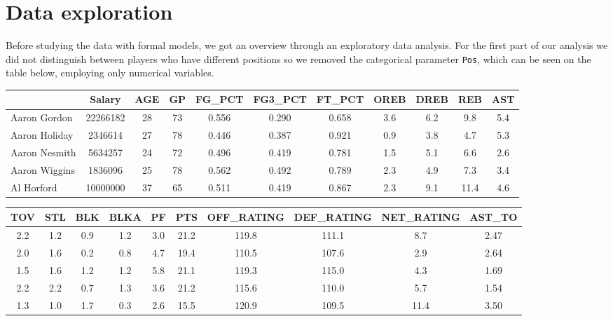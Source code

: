 \documentclass[
]{article}
\begin{document}
\hypertarget{data-exploration}{%
\section{Data exploration}\label{data-exploration}}

Before studying the data with formal models, we got an overview through
an exploratory data analysis. For the first part of our analysis we did
not distinguish between players who have different positions so we
removed the categorical parameter \texttt{Pos}, which can be seen on the
table below, employing only numerical variables.

\begin{longtable}[]{@{}lcccccccccc@{}}
\toprule()
& Salary & AGE & GP & FG\_PCT & FG3\_PCT & FT\_PCT & OREB & DREB & REB &
AST \\
\midrule()
\endhead
Aaron Gordon & 22266182 & 28 & 73 & 0.556 & 0.290 & 0.658 & 3.6 & 6.2 &
9.8 & 5.4 \\
Aaron Holiday & 2346614 & 27 & 78 & 0.446 & 0.387 & 0.921 & 0.9 & 3.8 &
4.7 & 5.3 \\
Aaron Nesmith & 5634257 & 24 & 72 & 0.496 & 0.419 & 0.781 & 1.5 & 5.1 &
6.6 & 2.6 \\
Aaron Wiggins & 1836096 & 25 & 78 & 0.562 & 0.492 & 0.789 & 2.3 & 4.9 &
7.3 & 3.4 \\
Al Horford & 10000000 & 37 & 65 & 0.511 & 0.419 & 0.867 & 2.3 & 9.1 &
11.4 & 4.6 \\
\bottomrule()
\end{longtable}

\begin{longtable}[]{@{}cccccccccc@{}}
\toprule()
TOV & STL & BLK & BLKA & PF & PTS & OFF\_RATING & DEF\_RATING &
NET\_RATING & AST\_TO \\
\midrule()
\endhead
2.2 & 1.2 & 0.9 & 1.2 & 3.0 & 21.2 & 119.8 & 111.1 & 8.7 & 2.47 \\
2.0 & 1.6 & 0.2 & 0.8 & 4.7 & 19.4 & 110.5 & 107.6 & 2.9 & 2.64 \\
1.5 & 1.6 & 1.2 & 1.2 & 5.8 & 21.1 & 119.3 & 115.0 & 4.3 & 1.69 \\
2.2 & 2.2 & 0.7 & 1.3 & 3.6 & 21.2 & 115.6 & 110.0 & 5.7 & 1.54 \\
1.3 & 1.0 & 1.7 & 0.3 & 2.6 & 15.5 & 120.9 & 109.5 & 11.4 & 3.50 \\
\bottomrule()
\end{longtable}
\end{document}

